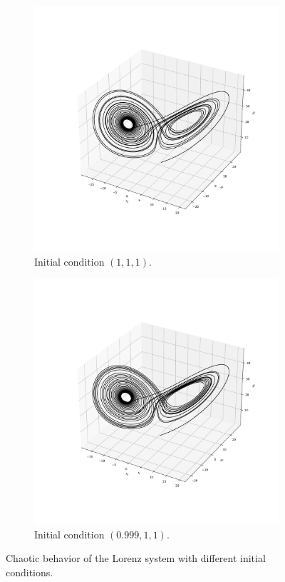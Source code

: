 \documentclass[11pt]{article}
\theoremstyle{definition}
\begin{document}
\begin{figure}
\centering
\begin{subfigure}{0.45\textwidth}
  \centering
  \includegraphics[trim=2cm 2cm 2cm 2cm, clip, scale=0.3]{Lorenz1.pdf}
  \caption{Initial condition $(1,1,1)$.}
  \label{subfig1:mp}
\end{subfigure}\hfill
\begin{subfigure}{0.45\textwidth}
  \centering
  \includegraphics[trim=2cm 2cm 2cm 2cm, clip, scale=0.3]{Lorenz2.pdf}
  \caption{Initial condition $(0.999,1,1)$.}
  \label{subfig2:mp}
\end{subfigure}
\caption{Chaotic behavior of the Lorenz system with different initial conditions.}
\label{fig:LE}
\end{figure}   
\end{document}
